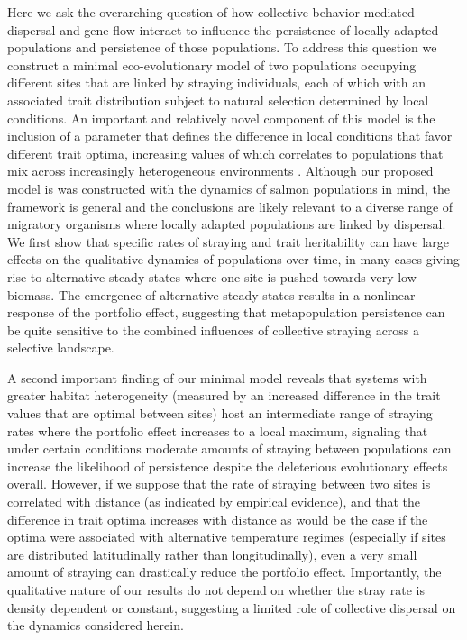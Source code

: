 \documentclass[twocolumn,preprintnumbers,amsmath,amssymb,superscriptaddress]{revtex4}
\begin{document}
Here we ask the overarching question of how collective behavior mediated dispersal and gene flow interact to influence the persistence of locally adapted populations and persistence of those populations.
To address this question we construct a minimal eco-evolutionary model of two populations occupying different sites that are linked by straying individuals, each of which with an associated trait distribution subject to natural selection determined by local conditions.
An important and relatively novel component of this model is the inclusion of a parameter that defines the difference in local conditions that favor different trait optima, increasing values of which correlates to populations that mix across increasingly heterogeneous environments \cite[though see ]{Berdahl:2015kv}.
Although our proposed model is was constructed with the dynamics of salmon populations in mind, the framework is general and the conclusions are likely relevant to a diverse range of migratory organisms where locally adapted populations are linked by dispersal.
We first show that specific rates of straying and trait heritability can have large effects on the qualitative dynamics of populations over time, in many cases giving rise to alternative steady states where one site is pushed towards very low biomass.
The emergence of alternative steady states results in a nonlinear response of the portfolio effect, suggesting that metapopulation persistence can be quite sensitive to the combined influences of  collective straying across a selective landscape.

A second important finding of our minimal model reveals that systems with greater habitat heterogeneity (measured by an increased difference in the trait values that are optimal between sites) host an intermediate range of straying rates where the portfolio effect increases to a local maximum, signaling that under certain conditions moderate amounts of straying between populations can increase the likelihood of persistence despite the deleterious evolutionary effects overall.
However, if we suppose that the rate of straying between two sites is correlated with distance (as indicated by empirical evidence), and that the difference in trait optima increases with distance as would be the case if the optima were associated with alternative temperature regimes (especially if sites are distributed latitudinally rather than longitudinally), even a very small amount of straying can drastically reduce the portfolio effect.
Importantly, the qualitative nature of our results do not depend on whether the stray rate is density dependent or constant, suggesting a limited role of collective dispersal on the dynamics considered herein.
\end{document}
